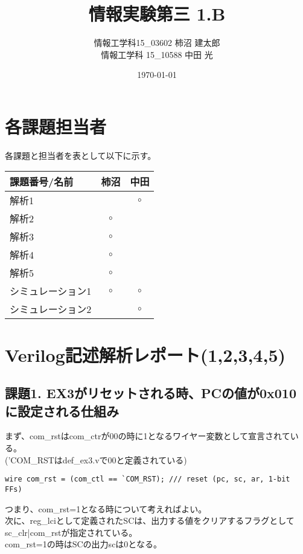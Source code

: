 \documentclass{jsarticle}
\title{情報実験第三 1.B}
\author{情報工学科15\_03602 柿沼 建太郎 \\ 情報工学科 15\_10588 中田 光}
\date{\today}
\begin{document}
\maketitle

\section*{各課題担当者}
各課題と担当者を表として以下に示す。
\begin{table}[h]
\begin{tabular}{|l|c|c|} \hline
課題番号/名前 & 柿沼 & 中田 \\ \hline \hline
解析1 &  & $\circ$ \\ \hline
解析2 & $\circ$ & \\ \hline
解析3 & $\circ$ & \\ \hline
解析4 & $\circ$ & \\ \hline
解析5 & $\circ$ & \\ \hline
シミュレーション1 & $\circ$ & $\circ$ \\ \hline
シミュレーション2 &  & $\circ$  \\ \hline
\end{tabular}
\end{table}

\section*{Verilog記述解析レポート(1,2,3,4,5)}

\subsection*{課題1. EX3がリセットされる時、PCの値が0x010に設定される仕組み}

まず、com\_rstはcom\_ctrが00の時に1となるワイヤー変数として宣言されている。 \\
('COM\_RSTはdef\_ex3.vで00と定義されている)

\begin{lstlisting}[caption=cpu\_ex3.v 33行目]
wire com_rst = (com_ctl == `COM_RST); /// reset (pc, sc, ar, 1-bit FFs)
\end{lstlisting}

つまり、com\_rst=1となる時について考えればよい。\\
次に、reg\_lciとして定義されたSCは、出力する値をクリアするフラグとしてsc\_clr|com\_rstが指定されている。 \\
com\_rst=1の時はSCの出力scは0となる。
\end{document}
